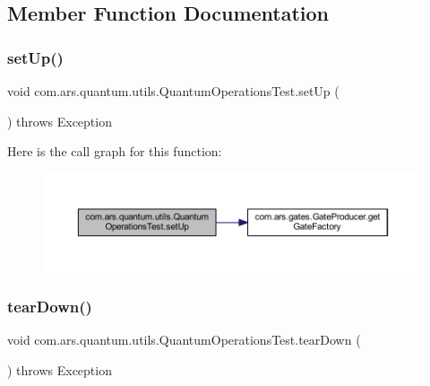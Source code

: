 \subsection{Member Function Documentation}
\hypertarget{classcom_1_1ars_1_1quantum_1_1utils_1_1_quantum_operations_test_a8f96706026f3d321f59725f30fdb0b5e}{}\label{classcom_1_1ars_1_1quantum_1_1utils_1_1_quantum_operations_test_a8f96706026f3d321f59725f30fdb0b5e} 
\subsubsection{\texorpdfstring{set\+Up()}{setUp()}}
{\footnotesize\ttfamily void com.\+ars.\+quantum.\+utils.\+Quantum\+Operations\+Test.\+set\+Up (\begin{DoxyParamCaption}{ }\end{DoxyParamCaption}) throws Exception}

Here is the call graph for this function\+:\nopagebreak
\begin{figure}[H]
\begin{center}
\leavevmode
\includegraphics[width=350pt]{classcom_1_1ars_1_1quantum_1_1utils_1_1_quantum_operations_test_a8f96706026f3d321f59725f30fdb0b5e_cgraph}
\end{center}
\end{figure}
\hypertarget{classcom_1_1ars_1_1quantum_1_1utils_1_1_quantum_operations_test_a3875eec94e51a4e5ee40a21beb171fe8}{}\label{classcom_1_1ars_1_1quantum_1_1utils_1_1_quantum_operations_test_a3875eec94e51a4e5ee40a21beb171fe8} 
\subsubsection{\texorpdfstring{tear\+Down()}{tearDown()}}
{\footnotesize\ttfamily void com.\+ars.\+quantum.\+utils.\+Quantum\+Operations\+Test.\+tear\+Down (\begin{DoxyParamCaption}{ }\end{DoxyParamCaption}) throws Exception}

